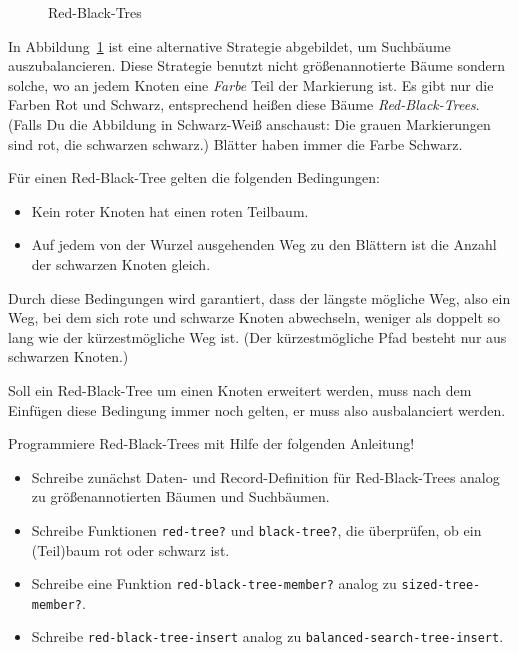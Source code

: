 \begin{aufgabe}
\begin{figure}[tbh]
\begin{tikzpicture}[scale=0.9,
        level/.style={sibling distance=13mm},
        triangle/.style = {regular polygon, regular polygon sides=3, draw},
        every node/.style={scale=0.8}]
\end{tikzpicture}    
    \caption{Red-Black-Tres}
    \label{fig:red-black-trees}
  \end{figure}

  In Abbildung~\ref{fig:red-black-trees} ist eine alternative
  Strategie abgebildet, um Suchbäume auszubalancieren. Diese Strategie
  benutzt nicht größenannotierte Bäume sondern solche, wo an
  jedem Knoten eine \textit{Farbe} Teil der Markierung ist.  Es gibt
  nur die Farben Rot und Schwarz, entsprechend heißen diese Bäume
  \textit{Red-Black-Trees}.  (Falls Du die
  Abbildung in Schwarz-Weiß anschaust: Die grauen Markierungen sind
  rot, die schwarzen schwarz.)  Blätter haben immer die Farbe Schwarz.

  Für einen Red-Black-Tree gelten die folgenden Bedingungen:
  \begin{itemize}
  \item Kein roter Knoten hat einen roten Teilbaum.
  \item Auf jedem von der Wurzel ausgehenden Weg zu den Blättern ist
    die Anzahl der schwarzen Knoten gleich.
  \end{itemize}
  Durch diese Bedingungen wird garantiert, dass der längste mögliche
  Weg, also ein Weg, bei dem sich rote und schwarze Knoten abwechseln,
  weniger als doppelt so lang wie der kürzestmögliche Weg ist. (Der
  kürzestmögliche Pfad besteht nur aus schwarzen Knoten.)

  Soll ein
  Red-Black-Tree um einen Knoten erweitert werden, muss nach dem
  Einfügen diese Bedingung immer noch gelten, er muss also
  ausbalanciert werden.

  Programmiere Red-Black-Trees mit Hilfe der folgenden Anleitung!

  \begin{itemize}
  \item Schreibe zunächst Daten- und Record-Definition für
    Red-Black-Trees analog zu größenannotierten Bäumen und Suchbäumen.
  \item Schreibe Funktionen \lstinline{red-tree?}  und
    \lstinline{black-tree?}, die überprüfen, ob ein (Teil)baum rot oder
    schwarz ist.
  \item Schreibe eine Funktion \lstinline{red-black-tree-member?}
    analog zu \lstinline{sized-tree-member?}.
    
  \item Schreibe \lstinline{red-black-tree-insert}
    analog zu \lstinline{balanced-search-tree-insert}.
  \end{itemize}

\end{aufgabe}

